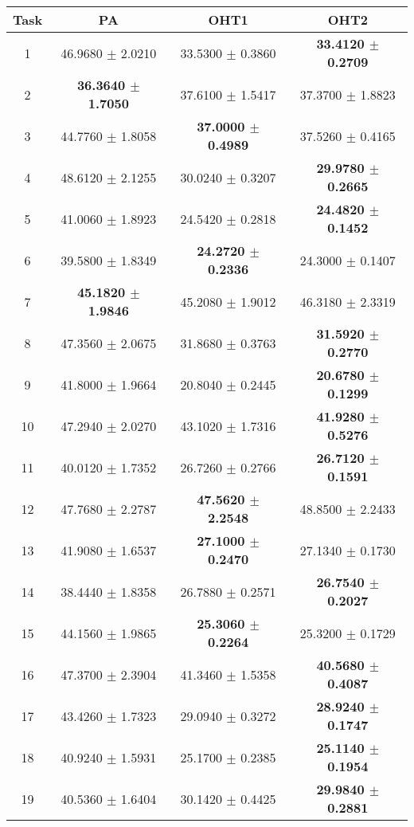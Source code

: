 \documentclass[twocolumn]{article}
\begin{document}
\begin{table}[!htb]
\tiny
\begin{tabular}{|c||c|c|c|}
\hline\hline
Task &	PA                            & OHT1                          & OHT2 \\
\hline\hline
%
1 & 46.9680 $\pm$ 2.0210 & 33.5300 $\pm$ 0.3860 & \textbf{33.4120 $\pm$ 0.2709}\\
2 & \textbf{36.3640 $\pm$ 1.7050} & 37.6100 $\pm$ 1.5417 & 37.3700 $\pm$ 1.8823\\
3 & 44.7760 $\pm$ 1.8058 & \textbf{37.0000 $\pm$ 0.4989} & 37.5260 $\pm$ 0.4165\\
4 & 48.6120 $\pm$ 2.1255 & 30.0240 $\pm$ 0.3207 & \textbf{29.9780 $\pm$ 0.2665}\\
5 & 41.0060 $\pm$ 1.8923 & 24.5420 $\pm$ 0.2818 & \textbf{24.4820 $\pm$ 0.1452}\\
6 & 39.5800 $\pm$ 1.8349 & \textbf{24.2720 $\pm$ 0.2336} & 24.3000 $\pm$ 0.1407\\
7 & \textbf{45.1820 $\pm$ 1.9846} & 45.2080 $\pm$ 1.9012 & 46.3180 $\pm$ 2.3319\\
8 & 47.3560 $\pm$ 2.0675 & 31.8680 $\pm$ 0.3763 & \textbf{31.5920 $\pm$ 0.2770}\\
9 & 41.8000 $\pm$ 1.9664 & 20.8040 $\pm$ 0.2445 & \textbf{20.6780 $\pm$ 0.1299}\\
10 & 47.2940 $\pm$ 2.0270 & 43.1020 $\pm$ 1.7316 & \textbf{41.9280 $\pm$ 0.5276}\\
11 & 40.0120 $\pm$ 1.7352 & 26.7260 $\pm$ 0.2766 & \textbf{26.7120 $\pm$ 0.1591}\\
12 & 47.7680 $\pm$ 2.2787 & \textbf{47.5620 $\pm$ 2.2548} & 48.8500 $\pm$ 2.2433\\
13 & 41.9080 $\pm$ 1.6537 & \textbf{27.1000 $\pm$ 0.2470} & 27.1340 $\pm$ 0.1730\\
14 & 38.4440 $\pm$ 1.8358 & 26.7880 $\pm$ 0.2571 & \textbf{26.7540 $\pm$ 0.2027}\\
15 & 44.1560 $\pm$ 1.9865 & \textbf{25.3060 $\pm$ 0.2264} & 25.3200 $\pm$ 0.1729\\
16 & 47.3700 $\pm$ 2.3904 & 41.3460 $\pm$ 1.5358 & \textbf{40.5680 $\pm$ 0.4087}\\
17 & 43.4260 $\pm$ 1.7323 & 29.0940 $\pm$ 0.3272 & \textbf{28.9240 $\pm$ 0.1747}\\
18 & 40.9240 $\pm$ 1.5931 & 25.1700 $\pm$ 0.2385 & \textbf{25.1140 $\pm$ 0.1954}\\
19 & 40.5360 $\pm$ 1.6404 & 30.1420 $\pm$ 0.4425 & \textbf{29.9840 $\pm$ 0.2881}\\

\end{tabular}
\end{table}
\end{document}
